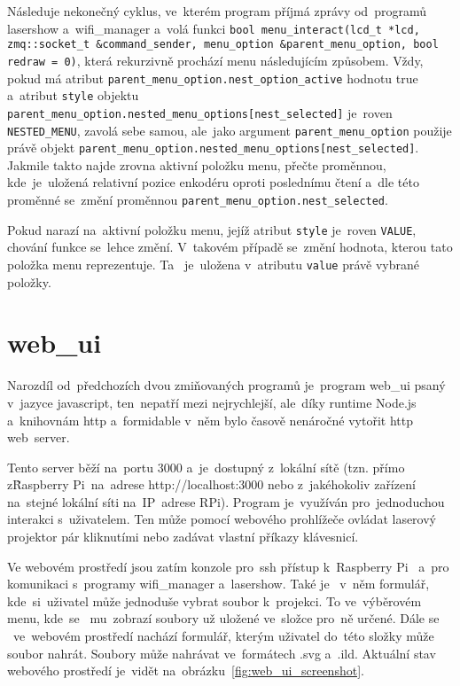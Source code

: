         Následuje nekonečný cyklus, ve~kterém program příjmá zprávy od~programů lasershow a~wifi\_manager a~volá funkci \texttt{bool menu_interact(lcd_t *lcd, zmq::socket_t &command_sender, menu_option &parent_menu_option, bool redraw = 0)}, která rekurzivně prochází menu následujícím způsobem.
Vždy, pokud má atribut \texttt{parent_menu_option.nest_option_active} hodnotu true a~atribut \texttt{style} objektu \texttt{parent_menu_option.nested_menu_options[nest_selected]} je~roven \texttt{NESTED_MENU}, zavolá sebe samou, ale~jako argument \texttt{parent_menu_option} použije právě objekt \texttt{parent_menu_option.nested_menu_options[nest_selected]}.
Jakmile takto najde zrovna aktivní položku menu, přečte proměnnou, kde~je~uložená relativní pozice enkodéru oproti poslednímu čtení a~dle této proměnné se~změní proměnnou \texttt{parent_menu_option.nest_selected}.

Pokud narazí na~aktivní položku menu, jejíž atribut \texttt{style} je~roven \texttt{VALUE}, chování funkce se~lehce změní. V~takovém případě se~změní hodnota, kterou tato položka menu reprezentuje. Ta ~je~uložena v~atributu \texttt{value} právě vybrané položky.

\section{web\_ui}

Narozdíl od~předchozích dvou zmiňovaných programů je~program web\_ui psaný v~jazyce javascript, ten~nepatří mezi nejrychlejší, ale~díky runtime Node.js a~knihovnám http a~formidable v~něm bylo časově nenáročné vytořit http web~server.

Tento server běží na~portu 3000 a~je~dostupný z~lokální sítě (tzn. přímo z\~Raspberry Pi~na~adrese http://localhost:3000 nebo z~jakéhokoliv zařízení na~stejné lokální síti na~IP~adrese RPi).
Program je~využíván pro~jednoduchou interakci s~uživatelem.
Ten může pomocí webového prohlížeče ovládat laserový projektor pár kliknutími nebo zadávat vlastní příkazy klávesnicí.

Ve webovém prostředí jsou zatím konzole pro~ssh přístup k~Raspberry Pi ~a~pro komunikaci s~programy wifi\_manager a~lasershow.
Také je ~v~něm formulář, kde~si~uživatel může jednoduše vybrat soubor k~projekci.
To ve~výběrovém menu, kde~se ~mu~zobrazí soubory už uložené ve~složce pro~ně určené. Dále se ~ve~webovém prostředí nachází formulář, kterým uživatel do~této složky může soubor nahrát. Soubory může nahrávat ve~formátech .svg a~.ild.
Aktuální stav webového prostředí je~vidět na~obrázku~\ref{fig:web_ui_screenshot}.

